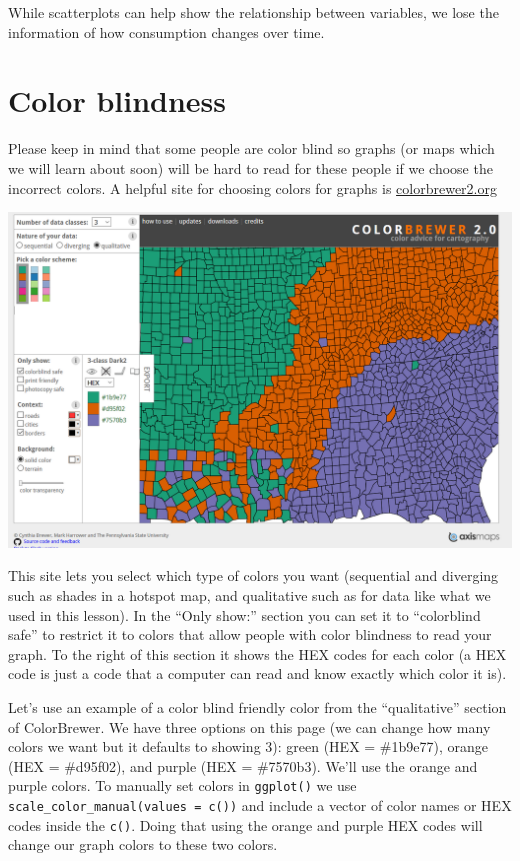 \documentclass[
  12pt,
  openany]{book}
\begin{document}
While scatterplots can help show the relationship between variables, we lose the information of how consumption changes over time.

\hypertarget{color-blindness}{%
\section{Color blindness}\label{color-blindness}}

Please keep in mind that some people are color blind so graphs (or maps which we will learn about soon) will be hard to read for these people if we choose the incorrect colors. A helpful site for choosing colors for graphs is \href{http://colorbrewer2.org}{colorbrewer2.org}

\includegraphics{images/colorbrewer.PNG}

This site lets you select which type of colors you want (sequential and diverging such as shades in a hotspot map, and qualitative such as for data like what we used in this lesson). In the ``Only show:'' section you can set it to ``colorblind safe'' to restrict it to colors that allow people with color blindness to read your graph. To the right of this section it shows the HEX codes for each color (a HEX code is just a code that a computer can read and know exactly which color it is).

Let's use an example of a color blind friendly color from the ``qualitative'' section of ColorBrewer. We have three options on this page (we can change how many colors we want but it defaults to showing 3): green (HEX = \#1b9e77), orange (HEX = \#d95f02), and purple (HEX = \#7570b3). We'll use the orange and purple colors. To manually set colors in \texttt{ggplot()} we use \texttt{scale\_color\_manual(values\ =\ c())} and include a vector of color names or HEX codes inside the \texttt{c()}. Doing that using the orange and purple HEX codes will change our graph colors to these two colors.
\end{document}
